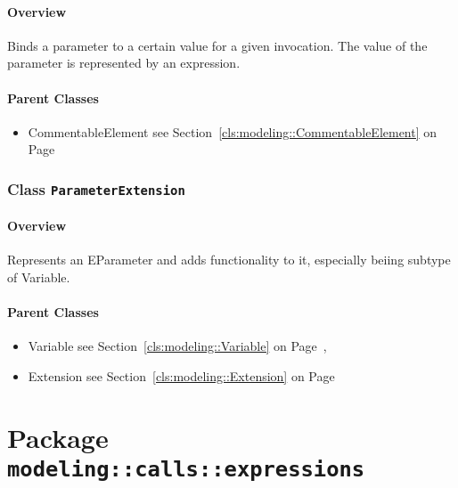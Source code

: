 \paragraph{Overview}

	
			
Binds a parameter to a certain value for a given invocation. The value of the parameter is represented by an expression.	
		
	



\paragraph{Parent Classes}
\begin{itemize}
\item CommentableElement see Section~\ref{cls:modeling::CommentableElement} on Page~\pageref{cls:modeling::CommentableElement}\end{itemize}
\subsubsection{\Large{Class \bfseries \texttt{ParameterExtension}\normalfont}}
\label{cls:modeling::calls::ParameterExtension} 
\paragraph{Overview}

	
			
Represents an EParameter and adds functionality to it, especially beiing subtype of Variable.	
		
	



\paragraph{Parent Classes}
\begin{itemize}
\item Variable see Section~\ref{cls:modeling::Variable} on Page~\pageref{cls:modeling::Variable}, \item Extension see Section~\ref{cls:modeling::Extension} on Page~\pageref{cls:modeling::Extension}\end{itemize}
\newpage
		


\section{Package \bfseries \texttt{modeling::calls::expressions}\normalfont}
